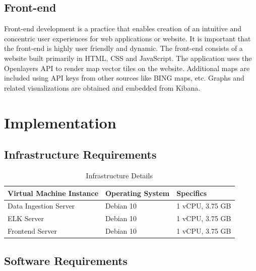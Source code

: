 \documentclass[]{report}
\begin{document}
\section{Front-end}
Front-end development is a practice that enables creation of an intuitive and concentric user experiences for web applications or website. It is important that the front-end is highly user friendly and dynamic. The front-end consists of a website built primarily in HTML, CSS and JavaScript. The application uses the Openlayers API to render map vector tiles on the website. Additional maps are included using API keys from other sources like BING maps, etc. Graphs and related visualizations are obtained and embedded from Kibana.


\chapter{Implementation}

\section{Infrastructure Requirements}

\begin{table}[ht]
\label{hardware}
\begin{center}
\begin{tabular} {l|l|l} %
\hline
\hline
\textbf{Virtual Machine Instance} & \textbf{Operating System} & \textbf{Specifics}  \\
\hline
Data Ingestion Server & Debian 10 & 1 vCPU, 3.75 GB \\
ELK Server & Debian 10 & 1 vCPU, 3.75 GB \\
Frontend Server & Debian 10 & 1 vCPU, 3.75 GB \\
\hline 
\hline
\end{tabular}
\end{center}
\caption{Infrastructure Details}
\end{table}


\section{Software Requirements}
\end{document}
